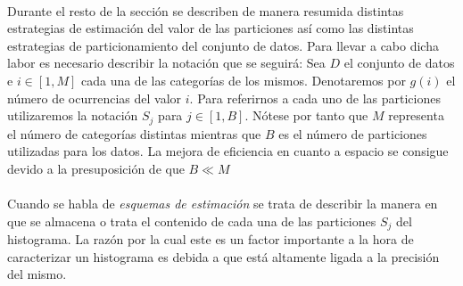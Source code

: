 \documentclass{subfiles}
\begin{document}
        \paragraph{}
        Durante el resto de la sección se describen de manera resumida distintas estrategias de estimación del valor de las particiones así como las distintas estrategias de particionamiento del conjunto de datos. Para llevar a cabo dicha labor es necesario describir la notación que se seguirá: Sea $D$ el conjunto de datos e $i \in [1,M]$ cada una de las categorías de los mismos. Denotaremos por $g(i)$ el número de ocurrencias del valor $i$. Para referirnos a cada uno de las particiones utilizaremos la notación $S_j$ para $j \in [1, B]$. Nótese por tanto que $M$ representa el número de categorías distintas mientras que $B$ es el número de particiones utilizadas para  los datos. La mejora de eficiencia en cuanto a espacio se consigue devido a la presuposición de que $B \ll M$


        \paragraph{}
        Cuando se habla de \emph{esquemas de estimación} se trata de describir la manera en que se almacena o trata el contenido de cada una de las particiones $S_j$ del histograma. La razón por la cual este es un factor importante a la hora de caracterizar un histograma es debida a que está altamente ligada a la precisión del mismo.
\end{document}

